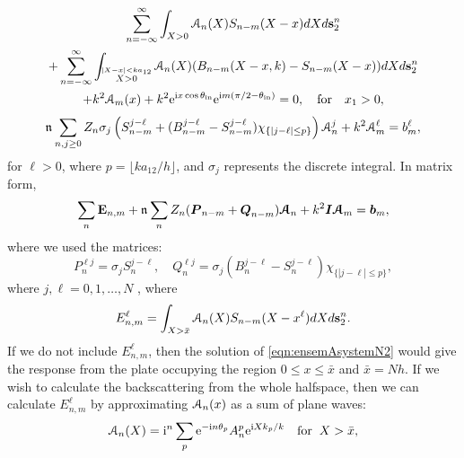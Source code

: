 \documentclass[12pt, a4paper]{article}
\begin{document}
\begin{multline}
  \sum_{n=-\infty}^\infty
  \int_{X>0} \mathcal A_n (X) S_{n-m}(X-x) dX
  d\mathbf s_2^n
  \\
  +  \sum_{n=-\infty}^\infty
    \int_{\stackrel{|X-x| < k a_{12}}{X>0}} \mathcal A_n (X) (B_{n-m}(X- x,k) - S_{n-m}(X-x) )dX
    d\mathbf s_2^n
\\
+  k^2 \mathcal A_m (x)   + k^2  \textrm{e}^{\textrm{i} x \cos \theta_{\mathrm{in}}} \textrm{e}^{\textrm{i} m ( \pi/2 - \theta_{\mathrm{in}} )}
   = 0, \quad \text{for} \quad x_1 >0,
  \label{eqn:ensemAsystem4}
\end{multline}
\begin{equation}
  \mathfrak n_{} \sum_{n,j \geq 0}  Z_n  \sigma_j  \left ( S_{n-m}^{j-\ell}
  +  (B_{n-m}^{j-\ell} - S_{n-m}^{j -\ell} ) \chi_{\{|j-\ell|\leq p\}} \right) \mathcal A_n^j+  k^2  \mathcal A_m^\ell  =  b_m^\ell,
  \label{eqn:ensemAsystemN}
\end{equation}
for $\ell >0$, where $p = \lfloor k a_{12}/h \rfloor$, and $\sigma_j$ represents the discrete integral. In matrix form,
\begin{equation}
  \sum_{n} \mathbf E_{n,m}
+ \mathfrak n_{} \sum_{n}  Z_n ( \boldsymbol{P}_{n-m} + \boldsymbol{Q}_{n-m}) \boldsymbol{\mathcal A}_n
+  k^2 \boldsymbol{I} \boldsymbol{\mathcal A}_m  =  \boldsymbol{b}_m,
  \label{eqn:ensemAsystemN2}
\end{equation}
where we used the matrices:
\begin{equation}
  P_{n}^{\ell j} =  \sigma_j S_{n}^{j-\ell}, \quad Q_{n}^{\ell j} = \sigma_j (B_{n}^{j-\ell} - S_{n}^{j -\ell} ) \chi_{\{|j-\ell| \leq p\}},
\end{equation}
where $j,\ell = 0,1, \ldots, N$
, where
\begin{equation}
  E_{n,m}^\ell  = \int_{X>\bar x} \mathcal A_n (X) S_{n-m}(X-x^\ell) dX  d\mathbf s_2^n.
  \label{eqn:E}
\end{equation}
If we do not include $E_{n,m}^\ell$, then the solution of \eqref{eqn:ensemAsystemN2} would give the response from the plate occupying the region $0 \leq x \leq \bar x$ and $\bar x = Nh$. If we wish to calculate the backscattering from the whole halfspace, then we can calculate $E_{n,m}^\ell$ by approximating $\mathcal A_n(x)$ as a sum of plane waves:
\begin{equation}
  \mathcal A_n(X) = \textrm{i}^n \sum_p \textrm{e}^{-\textrm{i} n \theta_p} A_{n}^p \textrm{e}^{\textrm{i} X k_p/k} \quad \text{for} \;\; X > \bar x ,
\label{eqn:effective_waves}
\end{equation}
\end{document}
